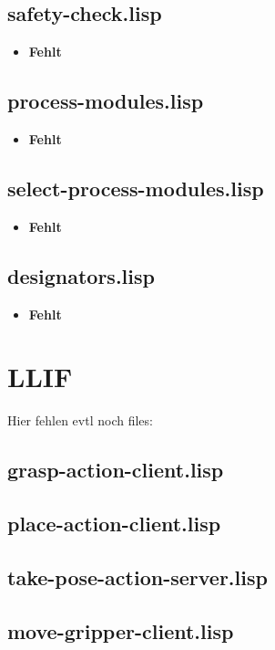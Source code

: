 \documentclass[main.tex]{subfiles}
\begin{document}
	    \subsection{safety-check.lisp}
	    \begin{itemize}
	    	\item \textbf{Fehlt} \\
	    \end{itemize}
	    \subsection{process-modules.lisp}
	    \begin{itemize}
	    	\item \textbf{Fehlt} \\
	    \end{itemize}
	    \subsection{select-process-modules.lisp}
	    \begin{itemize}
	    	\item \textbf{Fehlt} \\
	    \end{itemize}
	    \subsection{designators.lisp}
	    \begin{itemize}
	    	\item \textbf{Fehlt} \\
	    \end{itemize}

	  	\section{LLIF}
		Hier fehlen evtl noch files:
		\subsection{grasp-action-client.lisp}
		\subsection{place-action-client.lisp}
		\subsection{take-pose-action-server.lisp}
		\subsection{move-gripper-client.lisp}
\end{document}
